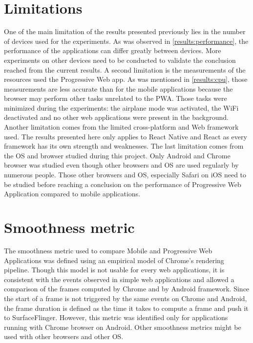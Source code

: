 \documentclass{kththesis}
\begin{document}
\section{Limitations}
One of the main limitation of the results presented previously lies in the number of devices used for the experiments. As was observed in \autoref{results:performance}, the performance of the applications can differ greatly between devices. More experiments on other devices need to be conducted to validate the conclusion reached from the current results. \newline
A second limitation is the measurements of the resources used the Progressive Web app. As was mentioned in \autoref{results:cpu}, those measurements are less accurate than for the mobile applications because the browser may perform other tasks unrelated to the PWA. Those tasks were minimized during the experiments: the airplane mode was activated, the WiFi deactivated and no other web applications were present in the background. \newline
Another limitation comes from the limited cross-platform and Web framework used. The results presented here only applies to React Native and React as every framework has its own strength and weaknesses. 
The last limitation comes from the OS and browser studied during this project. Only Android and Chrome browser was studied even though other browsers and OS are used regularly by numerous people. Those other browsers and OS, especially Safari on iOS need to be studied before reaching a conclusion on the performance of Progressive Web Application compared to mobile applications.

\section{Smoothness metric}
The smoothness metric used to compare Mobile and Progressive Web Applications was defined using an empirical model of Chrome's rendering pipeline. Though this model is not usable for every web applications, it is consistent with the events observed in simple web applications and allowed a comparison of the frames computed by Chrome and by Android framework. Since the start of a frame is not triggered by the same events on Chrome and Android, the frame duration is defined as the time it takes to compute a frame and push it to SurfaceFlinger. However, this metric was identified only for applications running with Chrome browser on Android. Other smoothness metrics might be used with other browsers and other OS. 
\end{document}
